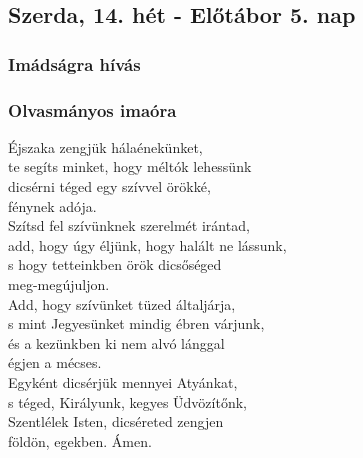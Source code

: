 \documentclass[twoside]{article}
\begin{document}
\subsection*{Szerda, 14. hét - Előtábor 5. nap}

\label{f4/Inv}

\subsubsection*{Imádságra hívás}



\subsubsection*{Olvasmányos imaóra}



Éjszaka zengjük hálaénekünket,\\
te segíts minket, hogy méltók lehessünk\\
dicsérni téged egy szívvel örökké,\\
fénynek adója.\\

Szítsd fel szívünknek szerelmét irántad,\\
add, hogy úgy éljünk, hogy halált ne lássunk,\\
s hogy tetteinkben örök dicsőséged\\
meg-megújuljon.\\

Add, hogy szívünket tüzed általjárja,\\
s mint Jegyesünket mindig ébren várjunk,\\
és a kezünkben ki nem alvó lánggal\\
égjen a mécses.\\

Egyként dicsérjük mennyei Atyánkat,\\
s téged, Királyunk, kegyes Üdvözítőnk,\\
Szentlélek Isten, dicséreted zengjen\\
földön, egekben. Ámen.\\



\end{document}
